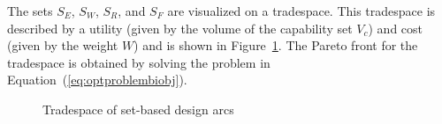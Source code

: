 The sets $S_E$, $S_W$, $S_R$, and $S_F$ are visualized on a tradespace. This tradespace is described by a utility (given by the volume of the capability set $V_c$) and cost (given by the weight $W$) and is shown in Figure~\ref{fig:tradespaceSBD}. The Pareto front for the tradespace is obtained by solving the problem in Equation~(\ref{eq:optproblembiobj}).

\begin{figure}[h!]
	\centering
	 \hspace{0.1\textwidth}%
	 \hspace{0.1\textwidth}%
	\caption{Tradespace of set-based design arcs}
	\label{fig:tradespaceSBD}
\end{figure}

